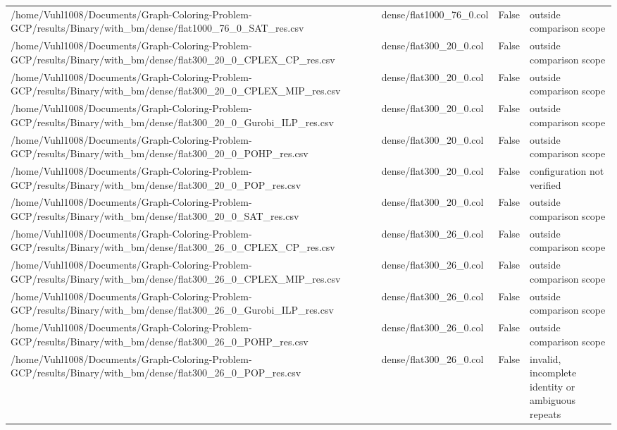 \begin{table}[htbp]
\begin{tabular}{llll}
/home/Vuhl1008/Documents/Graph-Coloring-Problem-GCP/results/Binary/with\_bm/dense/flat1000\_76\_0\_SAT\_res.csv & dense/flat1000\_76\_0.col & False & outside comparison scope \\
/home/Vuhl1008/Documents/Graph-Coloring-Problem-GCP/results/Binary/with\_bm/dense/flat300\_20\_0\_CPLEX\_CP\_res.csv & dense/flat300\_20\_0.col & False & outside comparison scope \\
/home/Vuhl1008/Documents/Graph-Coloring-Problem-GCP/results/Binary/with\_bm/dense/flat300\_20\_0\_CPLEX\_MIP\_res.csv & dense/flat300\_20\_0.col & False & outside comparison scope \\
/home/Vuhl1008/Documents/Graph-Coloring-Problem-GCP/results/Binary/with\_bm/dense/flat300\_20\_0\_Gurobi\_ILP\_res.csv & dense/flat300\_20\_0.col & False & outside comparison scope \\
/home/Vuhl1008/Documents/Graph-Coloring-Problem-GCP/results/Binary/with\_bm/dense/flat300\_20\_0\_POHP\_res.csv & dense/flat300\_20\_0.col & False & outside comparison scope \\
/home/Vuhl1008/Documents/Graph-Coloring-Problem-GCP/results/Binary/with\_bm/dense/flat300\_20\_0\_POP\_res.csv & dense/flat300\_20\_0.col & False & configuration not verified \\
/home/Vuhl1008/Documents/Graph-Coloring-Problem-GCP/results/Binary/with\_bm/dense/flat300\_20\_0\_SAT\_res.csv & dense/flat300\_20\_0.col & False & outside comparison scope \\
/home/Vuhl1008/Documents/Graph-Coloring-Problem-GCP/results/Binary/with\_bm/dense/flat300\_26\_0\_CPLEX\_CP\_res.csv & dense/flat300\_26\_0.col & False & outside comparison scope \\
/home/Vuhl1008/Documents/Graph-Coloring-Problem-GCP/results/Binary/with\_bm/dense/flat300\_26\_0\_CPLEX\_MIP\_res.csv & dense/flat300\_26\_0.col & False & outside comparison scope \\
/home/Vuhl1008/Documents/Graph-Coloring-Problem-GCP/results/Binary/with\_bm/dense/flat300\_26\_0\_Gurobi\_ILP\_res.csv & dense/flat300\_26\_0.col & False & outside comparison scope \\
/home/Vuhl1008/Documents/Graph-Coloring-Problem-GCP/results/Binary/with\_bm/dense/flat300\_26\_0\_POHP\_res.csv & dense/flat300\_26\_0.col & False & outside comparison scope \\
/home/Vuhl1008/Documents/Graph-Coloring-Problem-GCP/results/Binary/with\_bm/dense/flat300\_26\_0\_POP\_res.csv & dense/flat300\_26\_0.col & False & invalid, incomplete identity or ambiguous repeats \\

\end{tabular}
\end{table}
